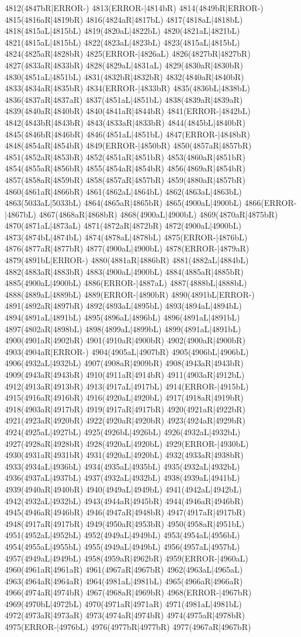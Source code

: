 4812(4847bR|ERROR-) 4813(ERROR-|4814bR) 4814(4849bR|ERROR-) 4815(4816aR|4819bR) 4816(4824aR|4817bL) 4817(4818aL|4818bL) 4818(4815aL|4815bL) 4819(4820aL|4822bL) 4820(4821aL|4821bL) 4821(4815aL|4815bL) 4822(4823aL|4823bL) 4823(4815aL|4815bL) 4824(4825aR|4828bR) 4825(ERROR-|4826aL) 4826(4827bR|4827bR) 4827(4833aR|4833bR) 4828(4829aL|4831aL) 4829(4830aR|4830bR) 4830(4851aL|4851bL) 4831(4832bR|4832bR) 4832(4840aR|4840bR) 4833(4834aR|4835bR) 4834(ERROR-|4833bR) 4835(4836bL|4838bL) 4836(4837aR|4837aR) 4837(4851aL|4851bL) 4838(4839aR|4839aR) 4839(4840aR|4840bR) 4840(4841aR|4844bR) 4841(ERROR-|4842bL) 4842(4843bR|4843bR) 4843(4833aR|4833bR) 4844(4845bL|4840bR) 4845(4846bR|4846bR) 4846(4851aL|4851bL) 4847(ERROR-|4848bR) 4848(4854aR|4854bR) 4849(ERROR-|4850bR) 4850(4857aR|4857bR) 4851(4852aR|4853bR) 4852(4851aR|4851bR) 4853(4860aR|4851bR) 4854(4855aR|4856bR) 4855(4854aR|4854bR) 4856(4869aR|4854bR) 4857(4858aR|4859bR) 4858(4857aR|4857bR) 4859(4880aR|4857bR) 4860(4861aR|4866bR) 4861(4862aL|4864bL) 4862(4863aL|4863bL) 4863(5033aL|5033bL) 4864(4865aR|4865bR) 4865(4900aL|4900bL) 4866(ERROR-|4867bL) 4867(4868aR|4868bR) 4868(4900aL|4900bL) 4869(4870aR|4875bR) 4870(4871aL|4873aL) 4871(4872aR|4872bR) 4872(4900aL|4900bL) 4873(4874bL|4874bL) 4874(4878aL|4878bL) 4875(ERROR-|4876bL) 4876(4877aR|4877bR) 4877(4900aL|4900bL) 4878(ERROR-|4879aR) 4879(4891bL|ERROR-) 4880(4881aR|4886bR) 4881(4882aL|4884bL) 4882(4883aR|4883bR) 4883(4900aL|4900bL) 4884(4885aR|4885bR) 4885(4900aL|4900bL) 4886(ERROR-|4887aL) 4887(4888bL|4888bL) 4888(4889aL|4889bL) 4889(ERROR-|4890bR) 4890(4891bL|ERROR-) 4891(4892aR|4897bR) 4892(4893aL|4895bL) 4893(4894aL|4894bL) 4894(4891aL|4891bL) 4895(4896aL|4896bL) 4896(4891aL|4891bL) 4897(4802aR|4898bL) 4898(4899aL|4899bL) 4899(4891aL|4891bL) 4900(4901aR|4902bR) 4901(4910aR|4900bR) 4902(4900aR|4900bR) 4903(4904aR|ERROR-) 4904(4905aL|4907bR) 4905(4906bL|4906bL) 4906(4932aL|4932bL) 4907(4908aR|4909bR) 4908(4943aR|4943bR) 4909(4943aR|4943bR) 4910(4911aR|4914bR) 4911(4903aR|4912bL) 4912(4913aR|4913bR) 4913(4917aL|4917bL) 4914(ERROR-|4915bL) 4915(4916aR|4916bR) 4916(4920aL|4920bL) 4917(4918aR|4919bR) 4918(4903aR|4917bR) 4919(4917aR|4917bR) 4920(4921aR|4922bR) 4921(4923aR|4920bR) 4922(4920aR|4920bR) 4923(4924aR|4929bR) 4924(4925aL|4927bL) 4925(4926bL|4926bL) 4926(4932aL|4932bL) 4927(4928aR|4928bR) 4928(4920aL|4920bL) 4929(ERROR-|4930bL) 4930(4931aR|4931bR) 4931(4920aL|4920bL) 4932(4933aR|4938bR) 4933(4934aL|4936bL) 4934(4935aL|4935bL) 4935(4932aL|4932bL) 4936(4937aL|4937bL) 4937(4932aL|4932bL) 4938(4939aL|4941bL) 4939(4940aR|4940bR) 4940(4949aL|4949bL) 4941(4942aL|4942bL) 4942(4932aL|4932bL) 4943(4944aR|4945bR) 4944(4946aR|4946bR) 4945(4946aR|4946bR) 4946(4947aR|4948bR) 4947(4917aR|4917bR) 4948(4917aR|4917bR) 4949(4950aR|4953bR) 4950(4958aR|4951bL) 4951(4952aL|4952bL) 4952(4949aL|4949bL) 4953(4954aL|4956bL) 4954(4955aL|4955bL) 4955(4949aL|4949bL) 4956(4957aL|4957bL) 4957(4949aL|4949bL) 4958(4959aR|4962bR) 4959(ERROR-|4960aL) 4960(4961aR|4961aR) 4961(4967aR|4967bR) 4962(4963aL|4965aL) 4963(4964aR|4964aR) 4964(4981aL|4981bL) 4965(4966aR|4966aR) 4966(4974aR|4974bR) 4967(4968aR|4969bR) 4968(ERROR-|4967bR) 4969(4970bL|4972bL) 4970(4971aR|4971aR) 4971(4981aL|4981bL) 4972(4973aR|4973aR) 4973(4974aR|4974bR) 4974(4975aR|4978bR) 4975(ERROR-|4976bL) 4976(4977bR|4977bR) 4977(4967aR|4967bR) 